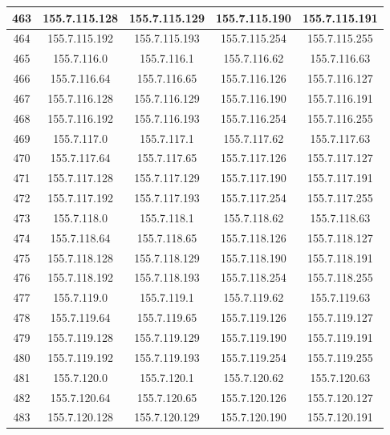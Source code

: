 \documentclass[letterpaper,12pt]{article}
\begin{document}
\begin{longtable}{|c|c|c|c|c|}
        463 & 155.7.115.128 & 155.7.115.129 & 155.7.115.190 & 155.7.115.191 \\ \hline
        464 & 155.7.115.192 & 155.7.115.193 & 155.7.115.254 & 155.7.115.255 \\ \hline
        465 & 155.7.116.0 & 155.7.116.1 & 155.7.116.62 & 155.7.116.63 \\ \hline
        466 & 155.7.116.64 & 155.7.116.65 & 155.7.116.126 & 155.7.116.127 \\ \hline
        467 & 155.7.116.128 & 155.7.116.129 & 155.7.116.190 & 155.7.116.191 \\ \hline
        468 & 155.7.116.192 & 155.7.116.193 & 155.7.116.254 & 155.7.116.255 \\ \hline
        469 & 155.7.117.0 & 155.7.117.1 & 155.7.117.62 & 155.7.117.63 \\ \hline
        470 & 155.7.117.64 & 155.7.117.65 & 155.7.117.126 & 155.7.117.127 \\ \hline
        471 & 155.7.117.128 & 155.7.117.129 & 155.7.117.190 & 155.7.117.191 \\ \hline
        472 & 155.7.117.192 & 155.7.117.193 & 155.7.117.254 & 155.7.117.255 \\ \hline
        473 & 155.7.118.0 & 155.7.118.1 & 155.7.118.62 & 155.7.118.63 \\ \hline
        474 & 155.7.118.64 & 155.7.118.65 & 155.7.118.126 & 155.7.118.127 \\ \hline
        475 & 155.7.118.128 & 155.7.118.129 & 155.7.118.190 & 155.7.118.191 \\ \hline
        476 & 155.7.118.192 & 155.7.118.193 & 155.7.118.254 & 155.7.118.255 \\ \hline
        477 & 155.7.119.0 & 155.7.119.1 & 155.7.119.62 & 155.7.119.63 \\ \hline
        478 & 155.7.119.64 & 155.7.119.65 & 155.7.119.126 & 155.7.119.127 \\ \hline
        479 & 155.7.119.128 & 155.7.119.129 & 155.7.119.190 & 155.7.119.191 \\ \hline
        480 & 155.7.119.192 & 155.7.119.193 & 155.7.119.254 & 155.7.119.255 \\ \hline
        481 & 155.7.120.0 & 155.7.120.1 & 155.7.120.62 & 155.7.120.63 \\ \hline
        482 & 155.7.120.64 & 155.7.120.65 & 155.7.120.126 & 155.7.120.127 \\ \hline
        483 & 155.7.120.128 & 155.7.120.129 & 155.7.120.190 & 155.7.120.191 \\ \hline

\end{longtable}
\end{document}
